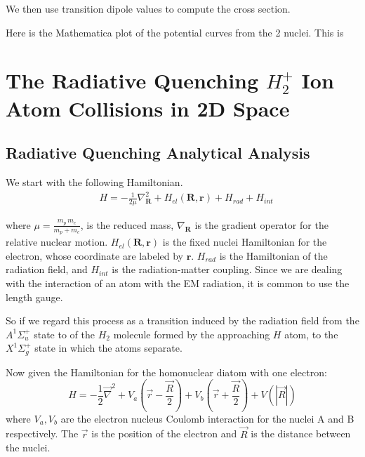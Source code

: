 We then use transition dipole values to compute the cross section.

Here is the Mathematica plot of the potential curves from the 2 nuclei. This is 



\chapter{The Radiative Quenching \texorpdfstring{$ H_2^+ $}{$H_2^+$}  Ion Atom Collisions in 2D Space} 
\label{chp:quenching}

\section{Radiative Quenching Analytical Analysis}

We start with the following Hamiltonian.
\begin{equation}\label{eqH1} 
\begin{split} 
& H = -\frac{1}{2\mu}\nabla^2_{\mathbf{R}} + H_{el}(\mathbf{R},\mathbf{r}) + H_{rad} + H_{int} 
\end{split} 
\end{equation} 

where $ \mu = \frac{m_p\,m_e}{m_p + m_e} $, is the reduced mass, $ \nabla_{\mathbf{R}} $ is the gradient operator for the relative nuclear motion. $ H_{el}(\mathbf{R},\mathbf{r}) $ is the fixed nuclei Hamiltonian for the electron, whose coordinate are labeled by $ \mathbf{r} $. $ H_{rad} $ is the Hamiltonian of the radiation field, and $ H_{int} $ is the radiation-matter coupling. Since we are dealing with the interaction of an atom with the EM radiation, it is common to use the length gauge.  

So if we regard this process as a transition induced by the radiation field from the $ A^{1}\Sigma^{+}_u $ state to of the $ H_2 $ molecule formed by the approaching $ H $ atom, to the $ X^{1}\Sigma^{+}_g $ state in which the atoms separate.

Now given the Hamiltonian for the homonuclear diatom with one electron:
\begin{equation}\label{hdia}
  H = -\frac{1}{2}\vec{\nabla}^2 + V_a(\vec{r} - \frac{\vec{R}}{2}) + V_b(\vec{r} + \frac{\vec{R}}{2}) + V(|\vec{R}|) 
\end{equation}
where $ V_a, V_b $ are the electron nucleus Coulomb interaction for the nuclei A and B respectively. The $ \vec{r} $ is the position of the electron and $ \vec{R} $ is the distance between the nuclei.

